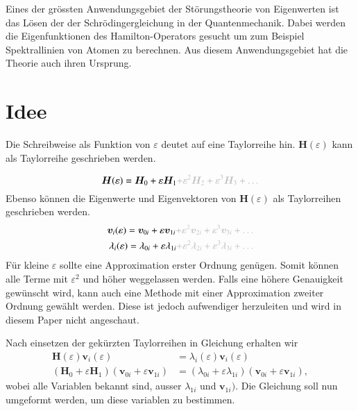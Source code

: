 Eines der grössten Anwendungsgebiet der Störungstheorie von Eigenwerten ist das Lösen der der Schrödingergleichung in der Quantenmechanik.
Dabei werden die Eigenfunktionen des Hamilton-Operators gesucht um zum Beispiel Spektrallinien von Atomen zu berechnen.
Aus diesem Anwendungsgebiet hat die Theorie auch ihren Ursprung. %

\section{Idee}

Die Schreibweise als Funktion von $\varepsilon$ deutet auf eine Taylorreihe hin.
$\bm H(\varepsilon)$ kann als Taylorreihe geschrieben werden.

\begin{equation*}
    \bm H(\varepsilon) = \bm H_0 + \varepsilon \bm H_1 \GR{ + \varepsilon^2 \bm H_2  + \varepsilon^3 \bm H_3 + \dots}
\end{equation*}
Ebenso können die Eigenwerte und Eigenvektoren von $\bm H(\varepsilon)$ als Taylorreihen geschrieben werden.
\begin{align}
    \bm v_i(\varepsilon) = \bm v_{0i} + \varepsilon \bm v_{1i} \GR{ + \varepsilon^2 \bm v_{2i}  + \varepsilon^3 \bm v_{3i} + \dots} \label{ew:eq:eigvec} \\
    \lambda_i(\varepsilon) = \lambda_{0i} + \varepsilon \lambda_{1i} \GR{ + \varepsilon^2 \lambda_{2i}  + \varepsilon^3 \lambda_{3i} + \dots}  \label{ew:eq:eigval}
\end{align}
Für kleine $\varepsilon$ sollte eine Approximation erster Ordnung genügen.
Somit können alle Terme mit $\varepsilon^2$ und höher weggelassen werden.
Falls eine höhere Genauigkeit gewünscht wird, kann auch eine Methode mit einer Approximation zweiter Ordnung gewählt werden.
Diese ist jedoch aufwendiger herzuleiten und wird in diesem Paper nicht angeschaut.

Nach einsetzen der gekürzten Taylorreihen in Gleichung  erhalten wir
\begin{align}
    \bm H(\varepsilon) \bm v_i(\varepsilon)
    &=
    \lambda_i(\varepsilon) \bm v_i(\varepsilon) \\
    (\bm H_0 + \varepsilon \bm H_1)
    (\bm v_{0i} + \varepsilon \bm v_{1i})
    &=
    (\lambda_{0i} + \varepsilon \lambda_{1i})
    (\bm v_{0i} + \varepsilon \bm v_{1i}),
\end{align}
wobei alle Variablen bekannt sind, ausser $\lambda_{1i}$ und $\bm v_{1i})$.
Die Gleichung soll nun umgeformt werden, um diese variablen zu bestimmen.

